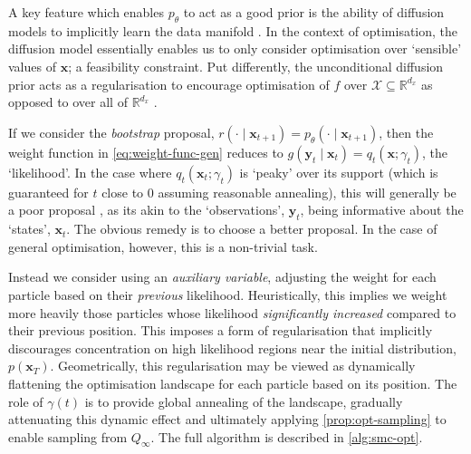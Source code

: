 \begin{remark}
    A key feature which enables $p_\theta$ to act as a good prior is the ability of diffusion models
    to implicitly learn the data manifold \parencite{debortoliDiffusionSchrOdinger2021,pidstrigachScoreBasedGenerativeModels2022,wenliangScorebasedGenerativeModels2023}.
    In the context of optimisation, the diffusion model essentially enables us to only consider
    optimisation over `sensible' values of $\mathbf{x}$; a feasibility constraint. Put differently,
    the unconditional diffusion prior acts as a regularisation to encourage optimisation of $f$ over
    $\mathcal{X} \subseteq \mathbb{R}^{d_x}$ as opposed to over all of $\mathbb{R}^{d_x}$
    \parencite{guoGradientGuidanceDiffusion2024}.
\end{remark}

If we consider the \emph{bootstrap} proposal,
$r(\cdot \mid \mathbf{x}_{t+1}) = p_\theta(\cdot \mid \mathbf{x}_{t+1})$, then the
weight function in \autoref{eq:weight-func-gen} reduces to
$g(\mathbf{y}_t \mid \mathbf{x}_t) = q_t(\mathbf{x}; \gamma_t)$, the `likelihood'. In the case where
$q_t(\mathbf{x}_t; \gamma_t)$ is `peaky' over its support (which is guaranteed for $t$ close to 0
assuming reasonable annealing), this will generally be a poor proposal
\parencite{chopinIntroductionSequentialMonte2020}, as its akin to the `observations',
$\mathbf{y}_t$, being informative about the `states', $\mathbf{x}_t$. The obvious remedy is to
choose a better proposal. In the case of general optimisation, however, this is a non-trivial task.

Instead we consider using an \emph{auxiliary variable}, adjusting the weight
for each particle based on their \emph{previous} likelihood. Heuristically, this implies we weight
more heavily those particles whose likelihood \emph{significantly increased} compared to their
previous position. This imposes a form of regularisation that implicitly discourages concentration on
high likelihood regions near the initial distribution, $p(\mathbf{x}_T)$. Geometrically, this
regularisation may be viewed as dynamically flattening the optimisation landscape for each particle
based on its position. The role of $\gamma(t)$ is to provide global annealing of the landscape,
gradually attenuating this dynamic effect and ultimately applying \autoref{prop:opt-sampling} to
enable sampling from $Q_\infty$. The full algorithm is described in \autoref{alg:smc-opt}.

